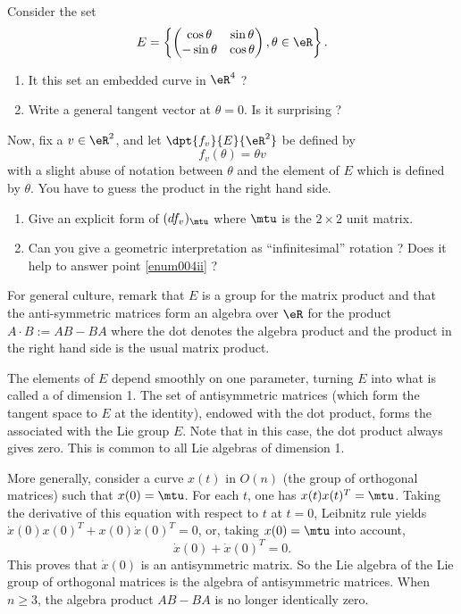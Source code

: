 \begin{exercice}\label{exo004}
Consider  the set
\[ 
  E=\left\{ 
\begin{pmatrix}
\cos\theta&\sin\theta\\
-\sin\theta&\cos\theta
 \end{pmatrix},
 \theta\in\eR\right\}.
\]


\begin{enumerate}
\item It this set an embedded curve in $\eR^4$ ?
\item Write a general tangent vector at $\theta=0$. Is it surprising ? \label{enum004ii}
\end{enumerate}

Now, fix a $v\in\eR^2$, and let $\dpt{ f_v }{ E }{ \eR^2 }$ be defined by
\[ 
  f_v(\theta)=\theta v
\]
with a slight abuse of notation between $\theta$ and the element of $E$ which is defined by $\theta$. You have to guess the product in the right hand side.

\begin{enumerate}
\item Give an explicit form of $(df_v)_{\mtu}$ where $\mtu$ is the $2\times 2$ unit matrix. 
\item Can you give a geometric interpretation as ``infinitesimal'' rotation ? Does it help to answer point \ref{enum004ii} ?
\end{enumerate}


For general culture, remark that $E$ is a group for the matrix product and that the anti-symmetric matrices form an algebra over $\eR$ for the product $A\cdot B:=AB-BA$ where the dot denotes the algebra product and the product in the right hand side is the usual matrix product. 

The elements of $E$ depend smoothly on one parameter, turning $E$ into what is called a  of dimension 1. The set of antisymmetric matrices (which form the tangent space to $E$ at the identity), endowed with the dot product, forms the  associated with the Lie group $E$. Note that in this case, the dot product always gives zero. This is common to all Lie algebras of dimension 1.

More generally, consider a curve $x(t)$ in $O(n)$  (the group of orthogonal matrices) such that $x(0)=\mtu$. For each $t$, one has $x(t)x(t)^T=\mtu$. Taking the derivative of this equation with respect to $t$ at $t=0$, Leibnitz rule yields  $\dot x(0)x(0)^T+x(0)\dot x(0)^T=0$, or, taking $x(0)=\mtu$ into account,
\[ 
  \dot x(0)+\dot x(0)^T=0.
\]
This proves that $\dot x(0)$ is an antisymmetric matrix. So the Lie algebra of the Lie group of orthogonal matrices is the algebra of antisymmetric matrices. When $n\geq 3$, the algebra product $AB-BA$ is no longer identically zero.

\end{exercice}
